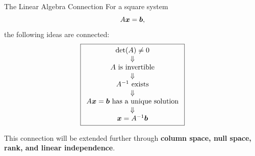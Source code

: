 \begin{frame}{The Linear Algebra Connection}
\vspace{-0.1cm}
For a square system
\vspace{-0.2cm}
\[
A\bm{x}=\bm{b},
\]
\vspace{-0.2cm}
the following ideas are connected:
\vspace{-0.09cm}
\[
\boxed{
\begin{array}{c}
\det(A)\neq0\\
\Downarrow\\
A\text{ is invertible}\\
\Downarrow\\
A^{-1}\text{ exists}\\
\Downarrow\\
A\bm{x}=\bm{b}\text{ has a unique solution}\\
\Downarrow\\
\bm{x}=A^{-1}\bm{b}
\end{array}
}
\]
\vspace{-0.1cm}

This connection will be extended further through
\textbf{column space, null space, rank, and linear independence}.

\end{frame}